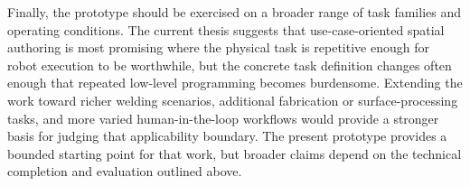 Finally, the prototype should be exercised on a broader range of task families and operating conditions. The current thesis suggests that use-case-oriented spatial authoring is most promising where the physical task is repetitive enough for robot execution to be worthwhile, but the concrete task definition changes often enough that repeated low-level programming becomes burdensome. Extending the work toward richer welding scenarios, additional fabrication or surface-processing tasks, and more varied human-in-the-loop workflows would provide a stronger basis for judging that applicability boundary. The present prototype provides a bounded starting point for that work, but broader claims depend on the technical completion and evaluation outlined above.
